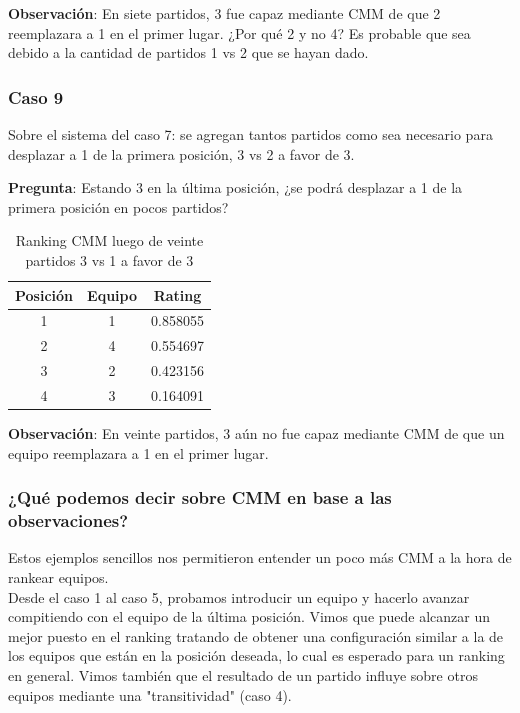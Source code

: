\textbf{Observación}: En siete partidos, 3 fue capaz mediante CMM de que 2 reemplazara a 1 en el primer lugar. ¿Por qué 2 y no 4? Es probable que sea debido a la cantidad de partidos 1 vs 2 que se hayan dado.

\subsubsection*{Caso 9}

Sobre el sistema del caso 7: se agregan tantos partidos como sea necesario para desplazar a 1 de la primera posición, 3 vs 2 a favor de 3.

\textbf{Pregunta}: Estando 3 en la última posición, ¿se podrá desplazar a 1 de la primera posición en pocos partidos?

\begin{table}[h!]
    \begin{center}
        \begin{tabular}{|c|c|c|}
        \hline
        \textbf{Posición} & \textbf{Equipo} & \textbf{Rating} \\
        \hline
        1 & 1 & 0.858055\\
        2 & 4 & 0.554697\\
        3 & 2 & 0.423156\\
        4 & 3 & 0.164091\\
        \hline
        \end{tabular}
        \caption{Ranking CMM luego de veinte partidos 3 vs 1 a favor de 3}
        \label{cmm_caso_9}
    \end{center}
\end{table}

\textbf{Observación}: En veinte partidos, 3 aún no fue capaz mediante CMM de que un equipo reemplazara a 1 en el primer lugar.

\newpage
\subsubsection{¿Qué podemos decir sobre CMM en base a las observaciones?}

Estos ejemplos sencillos nos permitieron entender un poco más CMM a la hora de rankear equipos.\\

Desde el caso 1 al caso 5, probamos introducir un equipo y hacerlo avanzar compitiendo con el equipo de la última posición. Vimos que puede alcanzar un mejor puesto en el ranking tratando de obtener una configuración similar a la de los equipos que están en la posición deseada, lo cual es esperado para un ranking en general. Vimos también que el resultado de un partido influye sobre otros equipos mediante una "transitividad" (caso 4).\\

